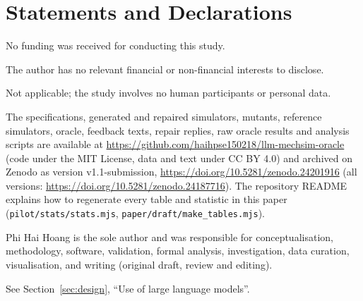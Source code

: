 \section*{Statements and Declarations}

 No funding was received for conducting this study.

 The author has no relevant financial or non-financial interests to disclose.

 Not applicable; the study involves no human participants or personal data.

 The specifications, generated and repaired simulators, mutants, reference simulators, oracle, feedback texts, repair replies, raw oracle results and analysis scripts are available at \url{https://github.com/haihpse150218/llm-mechsim-oracle} (code under the MIT License, data and text under CC BY 4.0) and archived on Zenodo as version v1.1-submission, \url{https://doi.org/10.5281/zenodo.24201916} (all versions: \url{https://doi.org/10.5281/zenodo.24187716}). The repository README explains how to regenerate every table and statistic in this paper (\texttt{pilot/stats/stats.mjs}, \texttt{paper/draft/make\_tables.mjs}).

 Phi Hai Hoang is the sole author and was responsible for conceptualisation, methodology, software, validation, formal analysis, investigation, data curation, visualisation, and writing (original draft, review and editing).

 See Section~\ref{sec:design}, ``Use of large language models''.
